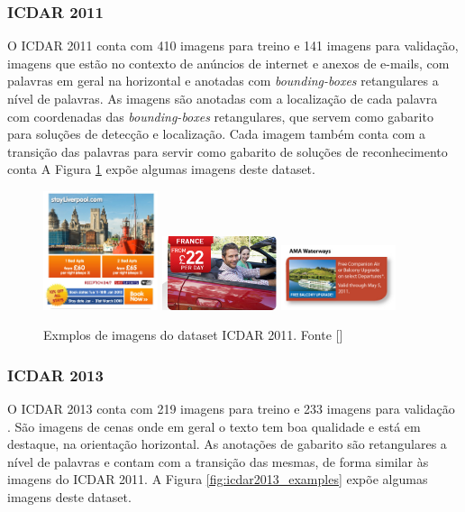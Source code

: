 \subsubsection{ICDAR 2011}\label{sec:datasets_icdar2011}
O ICDAR 2011 conta com 410 imagens para treino e 141 imagens para validação, imagens que estão no contexto de anúncios de internet e anexos de e-mails, com palavras em geral na horizontal e anotadas com \textit{bounding-boxes} retangulares a nível de palavras. As imagens são anotadas com a localização de cada palavra com coordenadas das \textit{bounding-boxes} retangulares, que servem como gabarito para soluções de detecção e localização. Cada imagem também conta com a transição das palavras para servir como gabarito de soluções de reconhecimento conta A Figura \ref{fig:icdar2011_examples} expõe algumas imagens deste dataset.

\begin{figure}
    \centering
    \includegraphics[width=0.3\textwidth]{figs/img_33.png}
    \includegraphics[width=0.3\textwidth]{figs/img_62.jpg}
    \includegraphics[width=0.3\textwidth]{figs/img_13.jpg}
    \caption{Exmplos de imagens do dataset ICDAR 2011. Fonte []}
        \label{fig:icdar2011_examples}
\end{figure}

\subsubsection{ICDAR 2013}\label{sec:datasets_icdar2013}
O ICDAR 2013 conta com 219 imagens para treino e 233 imagens para validação . São imagens de cenas onde em geral o texto tem boa qualidade e está em destaque, na orientação horizontal. As anotações de gabarito são retangulares a nível de palavras e contam com a transição das mesmas, de forma similar às imagens do ICDAR 2011. A Figura \ref{fig:icdar2013_examples} expõe algumas imagens deste dataset.

